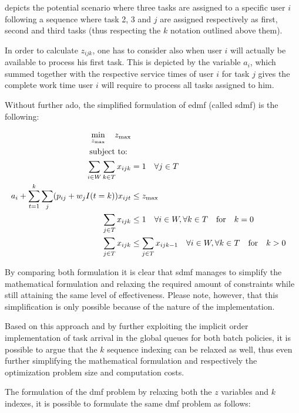 \documentclass{seal_thesis}
\begin{document}
 depicts the potential scenario where three tasks are assigned to a specific user $i$ following a sequence where task 2, 3 and $j$ are assigned respectively as first, second and third tasks (thus respecting the $k$ notation outlined above them).

In order to calculate $z_{ijk}$, one has to consider also when user $i$ will actually be available to process his first task. This is depicted by the variable $a_i$, which summed together with the respective service times of user $i$ for task $j$ gives the complete work time user $i$ will require to process all tasks assigned to him.


Without further ado, the simplified formulation of \gls{edmf} (called \gls{sdmf}) is the following:

\begin{align}
    \min_{z_{\text{max}}} \quad z_{\text{max}}\\
    \text{subject to: } \notag \\
    \sum_{i \in W} \sum_{k \in T} x_{ijk} &= 1 \quad \forall j \in T\\
    a_i + \sum_{t=1}^k \sum_j (p_{ij} + w_j I(t=k))x_{ijt} &\leq z_{\text{max}}\\
    \sum_{j \in T} x_{ijk} &\leq 1 \quad \forall i \in W, \forall k \in T \quad \text{for} \quad k=0\\
    \sum_{j \in T} x_{ijk} &\leq \sum_{j \in T} x_{ijk-1} \quad \forall i \in W, \forall k \in T \quad \text{for} \quad k>0
\end{align}

By comparing both formulation it is clear that \gls{sdmf} manages to simplify the mathematical formulation and relaxing the required amount of constraints while still attaining the same level of effectiveness. Please note, however, that this simplification is only possible because of the nature of the implementation.

Based on this approach and by further exploiting the implicit order implementation of task arrival in the global queues for both batch policies, it is possible to argue that the $k$ sequence indexing can be relaxed as well, thus even further simplifying the mathematical formulation and respectively the optimization problem size and computation costs.

The formulation of the \gls{dmf} problem by relaxing both the $z$ variables and $k$ indexes, it is possible to formulate the same \gls{dmf} problem as follows:
\end{document}

